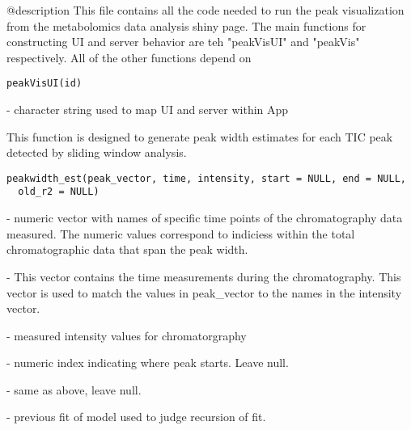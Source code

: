 \documentclass[a4paper]{book}
\begin{document}
%
\begin{Description}\relax
@description This file contains all the code needed to run the peak
visualization from the metabolomics data analysis shiny page. The main
functions for constructing UI and server behavior are teh "peakVisUI" and
"peakVis" respectively. All of the other functions depend on
\end{Description}
%
\begin{Usage}
\begin{verbatim}
peakVisUI(id)
\end{verbatim}
\end{Usage}
%
\begin{Arguments}
\begin{ldescription}
\item[\code{id}] - character string used to map UI and server within App
\end{ldescription}
\end{Arguments}
%
\begin{Description}\relax
This function is designed to generate peak width estimates for
each TIC peak detected by sliding window analysis.
\end{Description}
%
\begin{Usage}
\begin{verbatim}
peakwidth_est(peak_vector, time, intensity, start = NULL, end = NULL,
  old_r2 = NULL)
\end{verbatim}
\end{Usage}
%
\begin{Arguments}
\begin{ldescription}
\item[\code{peak\_vector}] - numeric vector with names of specific time points of the
chromatography data measured. The numeric values correspond to indiciess
within the total chromatographic data that span the peak width.

\item[\code{time}] - This vector contains the time measurements during the
chromatography. This vector is used to match the values in peak\_vector
to the names in the intensity vector.

\item[\code{intensity}] - measured intensity values for chromatorgraphy

\item[\code{start}] - numeric index indicating where peak starts. Leave null.

\item[\code{end}] - same as above, leave null.

\item[\code{old\_r2}] - previous fit of model used to judge recursion of fit.
\end{ldescription}
\end{Arguments}
\end{document}
